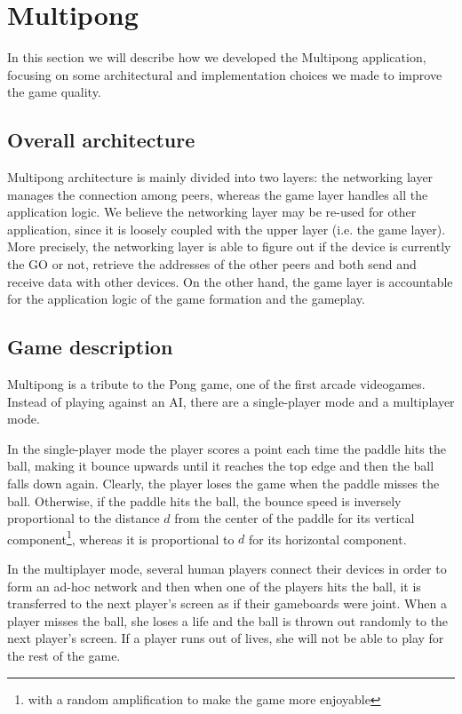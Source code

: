 \section{Multipong} %

In this section we will describe how we developed the Multipong application,
focusing on some architectural and implementation choices we made to improve
the game quality.

\subsection{Overall architecture}

Multipong architecture is mainly divided into two layers: the networking layer
manages the connection among peers, whereas the game layer handles all the
application logic. We believe the networking layer may be re-used for other
application, since it is loosely coupled with the upper layer (i.e. the game
layer).
More precisely, the networking layer is able to figure out if the device is
currently the GO or not, retrieve the addresses of the other peers and both
send and receive data with other devices.
On the other hand, the game layer is accountable for the application logic of
the game formation and the gameplay.

\subsection{Game description} %

Multipong is a tribute to the Pong game, one of the first arcade videogames.
Instead of playing against an AI, there are a single-player mode and a
multiplayer mode.

In the single-player mode the player scores a point each time the paddle hits
the ball, making it bounce upwards until it reaches the top edge and then the
ball falls down again. Clearly, the player loses the game when the paddle
misses the ball.
%
%
%
%
%
Otherwise, if the paddle hits the ball, the bounce speed is inversely
proportional to the distance $d$ from the center of the paddle for its
vertical component\footnote{with a random amplification to make the game more
enjoyable}, whereas it is proportional to $d$ for its horizontal component.

In the multiplayer mode, several human players connect their devices in order
to form an ad-hoc network and then when one of the players hits the ball, it is
transferred to the next player's screen as if their gameboards were joint.
When a player misses the ball, she loses a life and the ball is thrown out
randomly to the next player's screen.
If a player runs out of lives, she will not be able to play for the rest of the
game.


